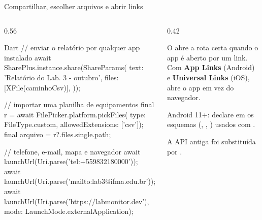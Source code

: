 \documentclass[aspectratio=169,10pt]{beamer}
\begin{document}
\begin{frame}[fragile]{Compartilhar, escolher arquivos e abrir links}
  \begin{columns}[T]
    \begin{column}{0.56\textwidth}
\begin{codigo}[title={share\_plus, file\_picker e url\_launcher}]{Dart}
// enviar o relatório por qualquer app instalado
await SharePlus.instance.share(ShareParams(
  text: 'Relatório do Lab. 3 - outubro',
  files: [XFile(caminhoCsv)],
));

// importar uma planilha de equipamentos
final r = await FilePicker.platform.pickFiles(
    type: FileType.custom, allowedExtensions: ['csv']);
final arquivo = r?.files.single.path;

// telefone, e-mail, mapa e navegador
await launchUrl(Uri.parse('tel:+559832180000'));
await launchUrl(Uri.parse('mailto:lab3@ifma.edu.br'));
await launchUrl(Uri.parse('https://labmonitor.dev'),
    mode: LaunchMode.externalApplication);
\end{codigo}
    \end{column}
    \begin{column}{0.42\textwidth}
      \begin{conceito}
        O  abre a rota certa quando o app é aberto por um link. Com \textbf{App Links} (Android) e \textbf{Universal Links} (iOS),  abre o app em vez do navegador.
      \end{conceito}
      \begin{atencao}
        Android 11+: declare em  os esquemas (, , ) usados com .
      \end{atencao}
      \begin{dica}
        A API antiga  foi substituída por .
      \end{dica}
    \end{column}
  \end{columns}
\end{frame}
\end{document}
